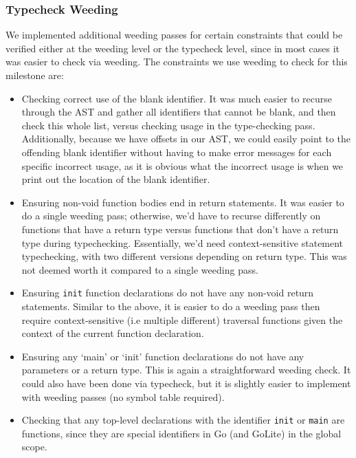 \documentclass[11pt]{article}
\begin{document}
\subsubsection{Typecheck Weeding}
We implemented additional weeding passes for certain constraints
that could be verified either at the weeding level or the typecheck
level, since in most cases it was easier to check via weeding. The
constraints we use weeding to check for this milestone are:
\begin{itemize}
	\item Checking correct use of the blank identifier. It was much easier to recurse
	      through the AST and gather all identifiers that cannot be blank,
	      and then check this whole list, versus checking usage in the
	      type-checking pass. Additionally, because we have offsets in our
	      AST, we could easily point to the offending blank identifier
	      without having to make error messages for each specific incorrect
	      usage, as it is obvious what the incorrect usage is when we print
	      out the location of the blank identifier.
	\item Ensuring non-void function bodies end in return statements. It was easier to
	      do a single weeding pass; otherwise, we'd have to recurse
	      differently on functions that have a return type versus functions
	      that don't have a return type during typechecking. Essentially,
	      we'd need context-sensitive statement typechecking, with two
	      different versions depending on return type. This was not deemed
	      worth it compared to a single weeding pass.
	\item Ensuring \texttt{init} function declarations do not have any non-void return
	      statements. Similar to the above, it is easier to do a weeding
	      pass then require context-sensitive (i.e multiple different)
	      traversal functions given the context of the current function
	      declaration.
	\item Ensuring any `main' or `init' function declarations do not have any
	      parameters or a return type. This is again a straightforward
	      weeding check.  It could also have been done via typecheck, but it
	      is slightly easier to implement with weeding passes (no symbol
	      table required).
	\item Checking that any top-level declarations with the identifier \texttt{init} or
	      \texttt{main} are functions, since they are special identifiers in Go
	      (and GoLite) in the global scope.
\end{itemize}
\end{document}
